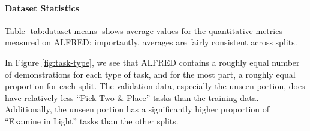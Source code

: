 \documentclass[11pt,a4paper]{article}
\begin{document}
\paragraph{Dataset Statistics}
Table \ref{tab:dataset-means} shows average values for the quantitative metrics measured on ALFRED: importantly, averages are fairly consistent across splits. 

\begin{table}[H]
\small
{}
\caption{Average values of various quantitative aspects of ALFRED by split. See below for definitions.}
\label{tab:dataset-means}
\end{table}

In Figure \ref{fig:task-type}, we see that ALFRED contains a roughly equal number of demonstrations for each type of task, and for the most part, a roughly equal proportion for each split. The validation data, especially the unseen portion, does have relatively less ``Pick Two \& Place'' tasks than the training data. Additionally, the unseen portion has a significantly higher proportion of ``Examine in Light'' tasks than the other splits.
\end{document}
